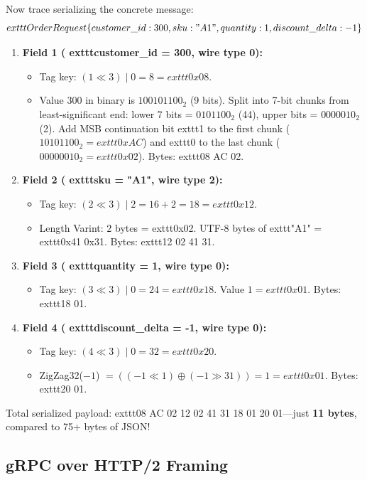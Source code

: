 Now trace serializing the concrete message:
$$	exttt{OrderRequest\{customer\_id: 300, sku: "A1", quantity: 1, discount\_delta: -1\}}$$
\begin{enumerate}[leftmargin=15pt]
  \item \textbf{Field 1 (	exttt{customer\_id = 300}, wire type 0):}
  \begin{itemize}
    \item Tag key: $(1 \ll 3) \mid 0 = 8 = 	exttt{0x08}$.
    \item Value $300$ in binary is $100101100_2$ (9 bits). Split into 7-bit chunks from least-significant end: lower 7 bits = $0101100_2$ (44), upper bits = $0000010_2$ (2). Add MSB continuation bit 	exttt{1} to the first chunk ($10101100_2 = 	exttt{0xAC}$) and 	exttt{0} to the last chunk ($00000010_2 = 	exttt{0x02}$). Bytes: 	exttt{08 AC 02}.
  \end{itemize}
  \item \textbf{Field 2 (	exttt{sku = "A1"}, wire type 2):}
  \begin{itemize}
    \item Tag key: $(2 \ll 3) \mid 2 = 16 + 2 = 18 = 	exttt{0x12}$.
    \item Length Varint: $2$ bytes = 	exttt{0x02}. UTF-8 bytes of 	exttt{"A1"} = 	exttt{0x41 0x31}. Bytes: 	exttt{12 02 41 31}.
  \end{itemize}
  \item \textbf{Field 3 (	exttt{quantity = 1}, wire type 0):}
  \begin{itemize}
    \item Tag key: $(3 \ll 3) \mid 0 = 24 = 	exttt{0x18}$. Value $1 = 	exttt{0x01}$. Bytes: 	exttt{18 01}.
  \end{itemize}
  \item \textbf{Field 4 (	exttt{discount\_delta = -1}, wire type 0):}
  \begin{itemize}
    \item Tag key: $(4 \ll 3) \mid 0 = 32 = 	exttt{0x20}$.
    \item ZigZag32($-1$) $= ((-1 \ll 1) \oplus (-1 \gg 31)) = 1 = 	exttt{0x01}$. Bytes: 	exttt{20 01}.
  \end{itemize}
\end{enumerate}
Total serialized payload: 	exttt{08 AC 02 12 02 41 31 18 01 20 01}---just \textbf{11 bytes}, compared to 75+ bytes of JSON!

\subsection{gRPC over HTTP/2 Framing}

